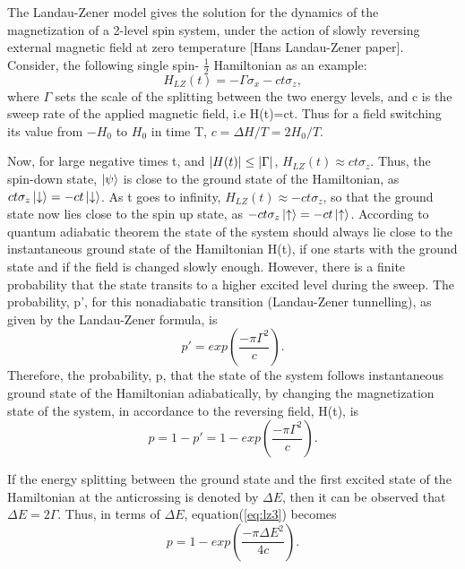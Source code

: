 \documentclass[../main.tex]{subfiles}
\begin{document}
The Landau-Zener model gives the solution for the dynamics of the magnetization of a 2-level spin system, under the action of slowly reversing external magnetic field at zero temperature [Hans Landau-Zener paper]. Consider, the following single spin- $\frac{1}{2}$ Hamiltonian as an example:
\begin{equation}
H_{LZ}(t)=-\Gamma \sigma_x -c t \sigma_z, \label{eq:lz1}
\end{equation}
where $\Gamma$ sets the scale of the splitting between the two energy levels, and c is the sweep rate of the applied magnetic field, i.e H(t)=ct. Thus for a field switching its value from $-H_0$ to $H_0$ in time T, $c=\Delta H/T= 2H_0/T$.

Now, for large negative times t, and $\abs{H(t)} \leq \abs{\Gamma}$, $H_{LZ}(t)\approx ct \sigma_z$. Thus, the spin-down state, $\ket{\psi}$ is close to the ground state of the Hamiltonian, as $ct \sigma_z \ket{\downarrow}=-ct \ket{\downarrow}$. As t goes to infinity, $H_{LZ}(t)\approx -ct \sigma_z$, so that the ground state now lies close to the spin up state, as $-ct \sigma_z \ket{\uparrow}=-ct \ket{\uparrow}$. According to quantum adiabatic theorem the state of the system should always lie close to the instantaneous ground state of the Hamiltonian H(t), if one starts with the ground state and if the field is changed slowly enough. However, there is a finite probability that the state transits to a higher excited level during the sweep. The probability, p', for this nonadiabatic transition (Landau-Zener tunnelling), as given by the Landau-Zener formula, is
\begin{equation}
p'=exp(\frac{-\pi {\Gamma}^2}{c}) . 
\end{equation}
Therefore, the probability, p, that the state of the system follows instantaneous ground state of the Hamiltonian adiabatically, by changing the magnetization state of the system, in accordance to the reversing field, H(t), is
\begin{equation}
p=1-p'=1-exp(\frac{-\pi {\Gamma}^2}{c}) .   \label{eq:lz2}
\end{equation}

If the energy splitting between the ground state and the first excited state of the Hamiltonian at the anticrossing is denoted by $\Delta E$, then it can be observed that $\Delta E= 2 \Gamma$. Thus, in terms of $\Delta E$, equation(\ref{eq:lz3}) becomes 
\begin{equation}
p=1-exp(\frac{-\pi {\Delta E}^2}{4c}) .   \label{eq:lz3}
\end{equation}
\end{document}
